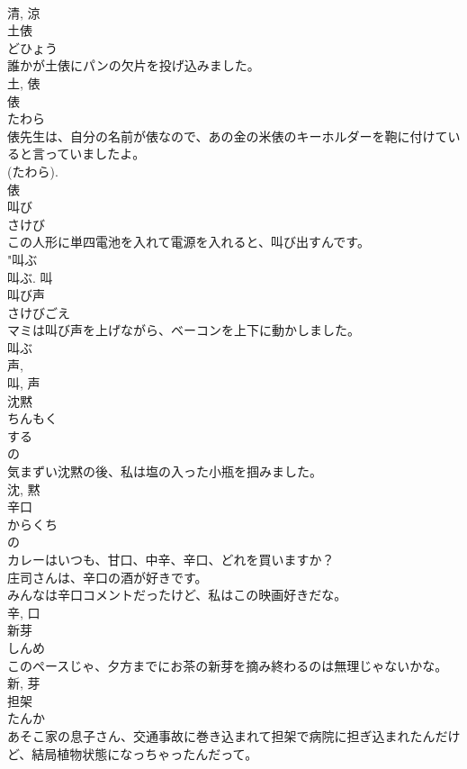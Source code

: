 \documentclass[8pt]{extreport}
\begin{document}
\begin{CJK}{UTF8}{min}
\\	清, 涼	
\\	土俵	
\\	どひょう	
\\	誰かが土俵にパンの欠片を投げ込みました。	
\\	土, 俵	
\\	俵	
\\	たわら	
\\	俵先生は、自分の名前が俵なので、あの金の米俵のキーホルダーを鞄に付けていると言っていましたよ。	
\\	(たわら). 
\\	俵	
\\	叫び	
\\	さけび	
\\	この人形に単四電池を入れて電源を入れると、叫び出すんです。	
\\	"叫ぶ 
\\	叫ぶ.	叫	
\\	叫び声	
\\	さけびごえ	
\\	マミは叫び声を上げながら、ベーコンを上下に動かしました。	
\\	叫ぶ 
\\	声, 
\\	叫, 声	
\\	沈黙	
\\	ちんもく	
\\	する 
\\	の 
\\	気まずい沈黙の後、私は塩の入った小瓶を掴みました。	
\\	沈, 黙	
\\	辛口	
\\	からくち	
\\	の 
\\	カレーはいつも、甘口、中辛、辛口、どれを買いますか？	
\\	庄司さんは、辛口の酒が好きです。	
\\	みんなは辛口コメントだったけど、私はこの映画好きだな。	
\\	辛, 口	
\\	新芽	
\\	しんめ	
\\	このペースじゃ、夕方までにお茶の新芽を摘み終わるのは無理じゃないかな。	
\\	新, 芽	
\\	担架	
\\	たんか	
\\	あそこ家の息子さん、交通事故に巻き込まれて担架で病院に担ぎ込まれたんだけど、結局植物状態になっちゃったんだって。	

\end{CJK}
\end{document}
